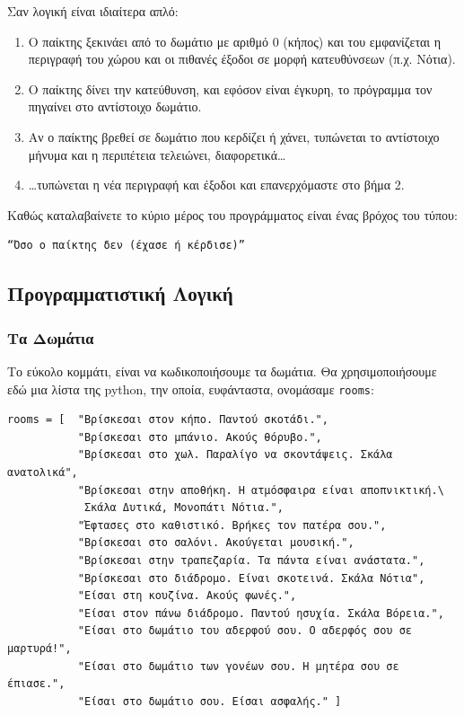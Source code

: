 Σαν λογική είναι ιδιαίτερα απλό:
%
\begin{enumerate}
\item Ο παίκτης ξεκινάει από το δωμάτιο με αριθμό 0 (κήπος) και του εμφανίζεται η περιγραφή του χώρου και οι πιθανές έξοδοι σε μορφή κατευθύνσεων (π.χ. Νότια).
\item Ο παίκτης δίνει την κατεύθυνση, και εφόσον είναι έγκυρη, το πρόγραμμα τον πηγαίνει στο αντίστοιχο δωμάτιο.
\item Αν ο παίκτης βρεθεί σε δωμάτιο που κερδίζει ή χάνει, τυπώνεται το
αντίστοιχο μήνυμα και η περιπέτεια τελειώνει, διαφορετικά\ldots
\item \ldots{}τυπώνεται η νέα περιγραφή και έξοδοι και επανερχόμαστε στο βήμα 2.
\end{enumerate}
%
Καθώς καταλαβαίνετε το κύριο μέρος του προγράμματος είναι ένας βρόχος του
τύπου:
%
\begin{verbatim}
“Όσο ο παίκτης δεν (έχασε ή κέρδισε)”
\end{verbatim}
%
\subsection{Προγραμματιστική Λογική}
%
\subsubsection{Τα Δωμάτια}
%
Το εύκολο κομμάτι, είναι να κωδικοποιήσουμε τα δωμάτια. Θα χρησιμοποιήσουμε
εδώ μια λίστα της python, την οποία, ευφάνταστα, ονομάσαμε {\tt rooms}:

\begin{verbatim}
rooms = [  "Βρίσκεσαι στον κήπο. Παντού σκοτάδι.",
           "Βρίσκεσαι στο μπάνιο. Ακούς θόρυβο.",
           "Βρίσκεσαι στο χωλ. Παραλίγο να σκοντάψεις. Σκάλα ανατολικά",
           "Βρίσκεσαι στην αποθήκη. Η ατμόσφαιρα είναι αποπνικτική.\
            Σκάλα Δυτικά, Μονοπάτι Νότια.",
           "Έφτασες στο καθιστικό. Βρήκες τον πατέρα σου.",
           "Βρίσκεσαι στο σαλόνι. Ακούγεται μουσική.",
           "Βρίσκεσαι στην τραπεζαρία. Τα πάντα είναι ανάστατα.",
           "Βρίσκεσαι στο διάδρομο. Είναι σκοτεινά. Σκάλα Νότια",
           "Είσαι στη κουζίνα. Ακούς φωνές.",
           "Είσαι στον πάνω διάδρομο. Παντού ησυχία. Σκάλα Βόρεια.",
           "Είσαι στο δωμάτιο του αδερφού σου. Ο αδερφός σου σε μαρτυρά!",
           "Είσαι στο δωμάτιο των γονέων σου. Η μητέρα σου σε έπιασε.",
           "Είσαι στο δωμάτιο σου. Είσαι ασφαλής." ]
\end{verbatim}

